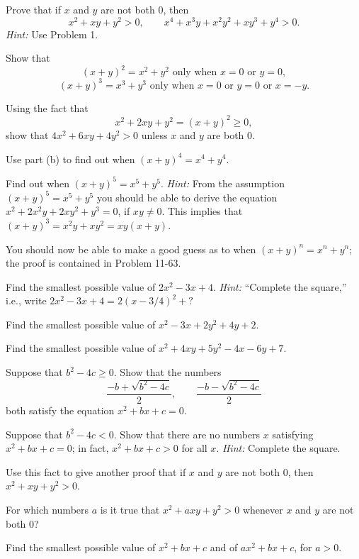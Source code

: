  Prove that if $x$ and $y$ are not both $0$, then
\[
x^2 + xy + y^2 > 0,
\qquad
x^4 + x^3y + x^2y^2 + xy^3 + y^4 > 0.
\]
\textit{Hint:} Use Problem 1.

\begin{letters}
\item Show that
\[
(x+y)^2 = x^2 + y^2 \text{ only when } x = 0 \text{ or } y = 0,
\]
\[
(x+y)^3 = x^3 + y^3 \text{ only when } x = 0 \text{ or } y = 0 \text{ or }
x = -y.
\]
\item Using the fact that
\[ x^2 + 2xy + y^2 = (x+y)^2 \geq 0, \]
show that $4x^2 + 6xy + 4y^2 > 0$ unless $x$ and $y$ are both $0$.
\item Use part (b) to find out when $(x+y)^4 = x^4 + y^4$.
\item Find out when $(x+y)^5 = x^5 + y^5$. \textit{Hint:} From the assumption
  $(x+y)^5 = x^5 + y^5$ you should be able to derive the equation
  $x^2 + 2x^2y + 2xy^2 + y^3 = 0$, if $xy \neq 0$. This implies that
  $(x+y)^3 = x^2y + xy^2 = xy(x+y)$.
\end{letters}
You should now be able to make a good guess as to when $(x+y)^n = x^n + y^n$;
the proof is contained in Problem 11-63.

\begin{letters}
\item Find the smallest possible value of $2x^2 - 3x + 4$. \textit{Hint:}
  ``Complete the square,'' i.e., write $2x^2 - 3x + 4 = 2(x - 3/4)^2 + \text{?}$
\item Find the smallest possible value of $x^2 - 3x + 2y^2 + 4y + 2$.
\item Find the smallest possible value of $x^2 + 4xy + 5y^2 - 4x - 6y + 7$.
\end{letters}

\begin{letters}
\item Suppose that $b^2 - 4c \geq 0$. Show that the numbers
\[ \frac{-b + \sqrt{b^2 - 4c}}{2}, \qquad \frac{-b - \sqrt{b^2 - 4c}}{2} \]
both satisfy the equation $x^2 + bx + c = 0$.
\item Suppose that $b^2 - 4c < 0$. Show that there are no numbers $x$
  satisfying $x^2 + bx + c = 0$; in fact, $x^2 + bx + c > 0$ for all $x$.
  \textit{Hint:} Complete the square.
\item Use this fact to give another proof that if $x$ and $y$ are not both
  $0$, then $x^2 + xy + y^2 > 0$.
\item For which numbers $a$ is it true that $x^2 + axy + y^2 > 0$ whenever
  $x$ and $y$ are not both $0$?
\item Find the smallest possible value of $x^2 + bx + c$ and of
  $ax^2 + bx + c$, for $a > 0$.
\end{letters}

